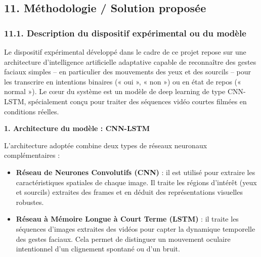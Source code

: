 \documentclass[
]{article}
\begin{document}
\hypertarget{section-48}{%
\subsection{}\label{section-48}}

\hypertarget{section-49}{%
\subsection{}\label{section-49}}

\hypertarget{section-50}{%
\subsection{}\label{section-50}}

\hypertarget{muxe9thodologie-solution-proposuxe9e}{%
\subsection{11. Méthodologie / Solution proposée}\label{muxe9thodologie-solution-proposuxe9e}}

\hypertarget{description-du-dispositif-expuxe9rimental-ou-du-moduxe8le}{%
\subsubsection{11.1. Description du dispositif expérimental ou du modèle}\label{description-du-dispositif-expuxe9rimental-ou-du-moduxe8le}}

Le dispositif expérimental développé dans le cadre de ce projet repose sur une architecture d'intelligence artificielle adaptative capable de reconnaître des gestes faciaux simples -- en particulier des mouvements des yeux et des sourcils -- pour les transcrire en intentions binaires (« oui », « non ») ou en état de repos (« normal »). Le cœur du système est un modèle de deep learning de type CNN-LSTM, spécialement conçu pour traiter des séquences vidéo courtes filmées en conditions réelles.

\textbf{1. Architecture du modèle : CNN-LSTM}

L'architecture adoptée combine deux types de réseaux neuronaux complémentaires :

\begin{itemize}
\item
  \textbf{Réseau de Neurones Convolutifs (CNN)} : il est utilisé pour extraire les caractéristiques spatiales de chaque image. Il traite les régions d'intérêt (yeux et sourcils) extraites des frames et en déduit des représentations visuelles robustes.
\item
  \textbf{Réseau à Mémoire Longue à Court Terme (LSTM)} : il traite les séquences d'images extraites des vidéos pour capter la dynamique temporelle des gestes faciaux. Cela permet de distinguer un mouvement oculaire intentionnel d'un clignement spontané ou d'un bruit.
\end{itemize}
\end{document}
